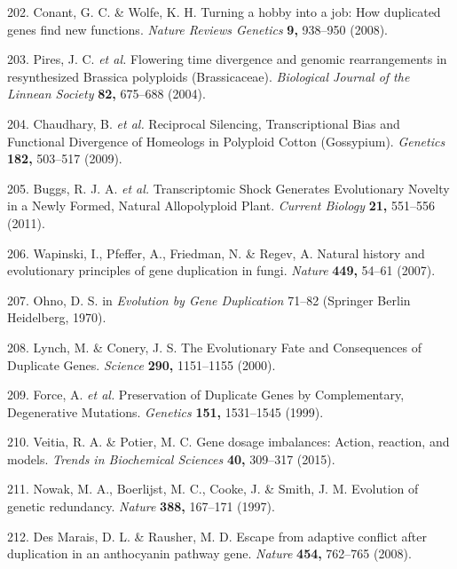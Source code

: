 \documentclass[12pt,]{book}
\begin{document}
\hypertarget{ref-conant_turning_2008}{}
202. Conant, G. C. \& Wolfe, K. H. Turning a hobby into a job: How
duplicated genes find new functions. \emph{Nature Reviews Genetics}
\textbf{9,} 938--950 (2008).

\hypertarget{ref-pires_flowering_2004}{}
203. Pires, J. C. \emph{et al.} Flowering time divergence and genomic
rearrangements in resynthesized Brassica polyploids (Brassicaceae).
\emph{Biological Journal of the Linnean Society} \textbf{82,} 675--688
(2004).

\hypertarget{ref-chaudhary_reciprocal_2009}{}
204. Chaudhary, B. \emph{et al.} Reciprocal Silencing, Transcriptional
Bias and Functional Divergence of Homeologs in Polyploid Cotton
(Gossypium). \emph{Genetics} \textbf{182,} 503--517 (2009).

\hypertarget{ref-buggs_transcriptomic_2011}{}
205. Buggs, R. J. A. \emph{et al.} Transcriptomic Shock Generates
Evolutionary Novelty in a Newly Formed, Natural Allopolyploid Plant.
\emph{Current Biology} \textbf{21,} 551--556 (2011).

\hypertarget{ref-wapinski_natural_2007}{}
206. Wapinski, I., Pfeffer, A., Friedman, N. \& Regev, A. Natural
history and evolutionary principles of gene duplication in fungi.
\emph{Nature} \textbf{449,} 54--61 (2007).

\hypertarget{ref-ohno_creation_1970}{}
207. Ohno, D. S. in \emph{Evolution by Gene Duplication} 71--82
(Springer Berlin Heidelberg, 1970).

\hypertarget{ref-lynch_evolutionary_2000}{}
208. Lynch, M. \& Conery, J. S. The Evolutionary Fate and Consequences
of Duplicate Genes. \emph{Science} \textbf{290,} 1151--1155 (2000).

\hypertarget{ref-force_preservation_1999}{}
209. Force, A. \emph{et al.} Preservation of Duplicate Genes by
Complementary, Degenerative Mutations. \emph{Genetics} \textbf{151,}
1531--1545 (1999).

\hypertarget{ref-veitia_gene_2015}{}
210. Veitia, R. A. \& Potier, M. C. Gene dosage imbalances: Action,
reaction, and models. \emph{Trends in Biochemical Sciences} \textbf{40,}
309--317 (2015).

\hypertarget{ref-nowak_evolution_1997}{}
211. Nowak, M. A., Boerlijst, M. C., Cooke, J. \& Smith, J. M. Evolution
of genetic redundancy. \emph{Nature} \textbf{388,} 167--171 (1997).

\hypertarget{ref-des_marais_escape_2008}{}
212. Des Marais, D. L. \& Rausher, M. D. Escape from adaptive conflict
after duplication in an anthocyanin pathway gene. \emph{Nature}
\textbf{454,} 762--765 (2008).
\end{document}
